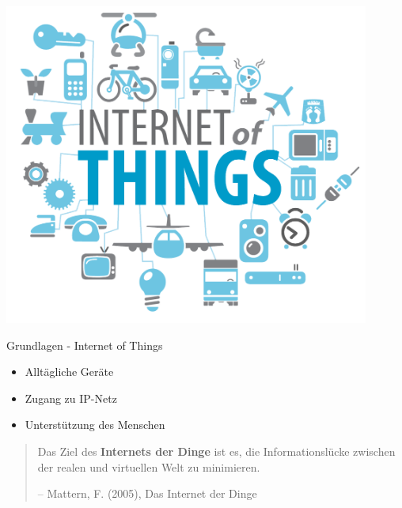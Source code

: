 \begin{frame}[fragile]
  \begin{center}
    \includegraphics[width=0.9\textwidth]{images/iot}
    \label{fig:iot}
  \end{center}
\end{frame}

\begin{frame}{Grundlagen - Internet of Things}
  \Large
  \begin{itemize}
    \item Alltägliche Geräte
    \item Zugang zu IP-Netz
    \item Unterstützung des Menschen
  \end{itemize}

  \vspace{0.5cm}

  \begin{quote}
    \normalsize
    Das Ziel des \textbf{Internets der Dinge} ist es, die Informationslücke
    zwischen der realen und virtuellen Welt zu minimieren.
    \begin{flushright}
      \small
      -- Mattern, F. (2005), Das Internet der Dinge
    \end{flushright}
  \end{quote}
\end{frame}


